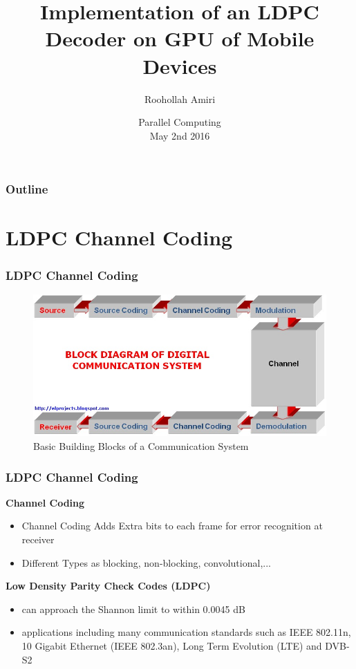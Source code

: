 \documentclass{beamer}
\title[LDPC GPU Decoder]{
  Implementation of an LDPC Decoder on GPU of Mobile Devices}
\author[Roohollah Amiri]{
  Roohollah Amiri\\\medskip
 }
\institute[Boise State University]{
  Department of Electrical and Computer and Engineering \\
  Boise State University}
\date[Parallel Computing 2016]{
  Parallel Computing\\
  May 2nd 2016}
\begin{document}
\begin{frame}
  \titlepage
\end{frame}

\begin{frame}
  \frametitle{Outline}

  \tableofcontents
\end{frame}

\section{LDPC Channel Coding}
\begin{frame}
  \frametitle{LDPC Channel Coding}

\begin{figure}[h]
\begin{centering}
\includegraphics[scale=0.3]{img/Communication-System.png}
\caption[width=.3\textwidth]{Basic Building Blocks of a Communication System}
\end{centering}
\end{figure}

\end{frame}
\begin{frame}
  \frametitle{LDPC Channel Coding}
  \textbf{Channel Coding}
    \begin{itemize}
    \item Channel Coding Adds Extra bits to each frame for error recognition at receiver
    \item Different Types as blocking, non-blocking, convolutional,...
  \end{itemize}
  \textbf{Low Density Parity Check Codes (LDPC)}
   \begin{itemize}
    \item can approach the Shannon limit to within 0.0045 dB
    \item applications including many communication standards such as IEEE 802.11n, 10 Gigabit Ethernet (IEEE 802.3an), Long Term Evolution (LTE) and DVB-S2
   \end{itemize}     
\end{frame}
\end{document}
